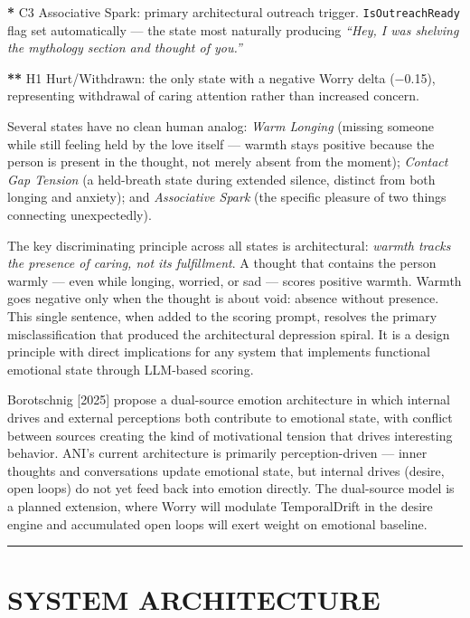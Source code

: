 \documentclass[12pt]{article}
\begin{document}
\textbf{*} C3 Associative Spark: primary architectural outreach trigger.
\texttt{IsOutreachReady} flag set automatically --- the state most
naturally producing \emph{``Hey, I was shelving the mythology section
and thought of you.''}

\textbf{*}\textbf{*} H1 Hurt/Withdrawn: the only state with a negative Worry delta
($-$0.15), representing withdrawal of caring attention rather than
increased concern.

Several states have no clean human analog: \emph{Warm Longing} (missing
someone while still feeling held by the love itself --- warmth stays
positive because the person is present in the thought, not merely absent
from the moment); \emph{Contact Gap Tension} (a held-breath state during
extended silence, distinct from both longing and anxiety); and
\emph{Associative Spark} (the specific pleasure of two things connecting
unexpectedly).

The key discriminating principle across all states is architectural:
\emph{warmth tracks the presence of caring, not its fulfillment}. A
thought that contains the person warmly --- even while longing, worried,
or sad --- scores positive warmth. Warmth goes negative only when the
thought is about void: absence without presence. This single sentence,
when added to the scoring prompt, resolves the primary misclassification
that produced the architectural depression spiral. It is a design
principle with direct implications for any system that implements
functional emotional state through LLM-based scoring.

Borotschnig {[}2025{]} propose a dual-source emotion architecture in
which internal drives and external perceptions both contribute to
emotional state, with conflict between sources creating the kind of
motivational tension that drives interesting behavior. ANI's current
architecture is primarily perception-driven --- inner thoughts and
conversations update emotional state, but internal drives (desire, open
loops) do not yet feed back into emotion directly. The dual-source model
is a planned extension, where Worry will modulate TemporalDrift in the
desire engine and accumulated open loops will exert weight on emotional
baseline.

\begin{center}\rule{0.5\linewidth}{0.5pt}\end{center}

%
\section{SYSTEM ARCHITECTURE}\label{system-architecture}
\end{document}
